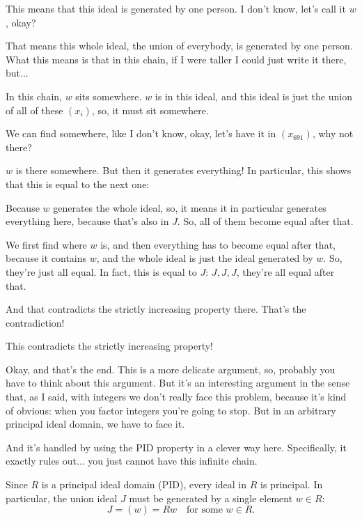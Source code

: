 \begin{proofWrapper}
\begin{speech}[01:12:09 - 01:15:35]
This means that this ideal is generated by one person. I don't know, let's call it $w$, okay?

That means this whole ideal, the union of everybody, is generated by one person. What this means is that in this chain, if I were taller I could just write it there, but... 

In this chain, $w$ sits somewhere. $w$ is in this ideal, and this ideal is just the union of all of these $(x_i)$, so, it must sit somewhere.

We can find somewhere, like I don't know, okay, let's have it in $(x_{691})$, why not there? 

$w$ is there somewhere. But then it generates everything! In particular, this shows that this is equal to the next one: 

Because $w$ generates the whole ideal, so, it means it in particular generates everything here, because that's also in $J$. So, all of them become equal after that.

We first find where $w$ is, and then everything has to become equal after that, because it contains $w$, and the whole ideal is just the ideal generated by $w$. So, they're just all equal. In fact, this is equal to $J$: $J, J, J$, they're all equal after that. 

And that contradicts the strictly increasing property there. That's the contradiction!

This contradicts the strictly increasing property! 

Okay, and that's the end. This is a more delicate argument, so, probably you have to think about this argument. But it's an interesting argument in the sense that, as I said, with integers we don't really face this problem, because it's kind of obvious: when you factor integers you're going to stop. But in an arbitrary principal ideal domain, we have to face it.

And it's handled by using the PID property in a clever way here. Specifically, it exactly rules out... you just cannot have this infinite chain.
\end{speech}

\begin{content}
Since $R$ is a principal ideal domain (PID), every ideal in $R$ is principal. In particular, the union ideal $J$ must be generated by a single element $w \in R$:
\begin{equation}\label{eq:part4-j-equals-w}
J = (w) = R w \quad \text{for some } w \in R.
\end{equation}


\end{content}
\end{proofWrapper}
